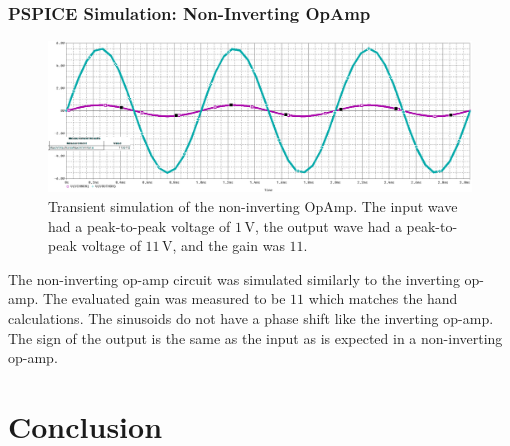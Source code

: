 \documentclass[11pt]{article}
\begin{document}
\pagebreak

\subsubsection{PSPICE Simulation: Non-Inverting OpAmp}
\begin{figure}[h]
	\includegraphics[width=\textwidth]{capture_non_thick}
	\caption{Transient simulation of the non-inverting OpAmp. The input wave had a peak-to-peak voltage of $1\,\si\volt$, the output wave had a peak-to-peak voltage of $11\,\si\volt$, and the gain was $11$.}
\end{figure}

The non-inverting op-amp circuit was simulated similarly to the inverting op-amp. The evaluated gain was measured to be $11$ which matches the hand calculations. The sinusoids do not have a phase shift like the inverting op-amp. The sign of the output is the same as the input as is expected in a non-inverting op-amp.

\section{Conclusion}
\end{document}
